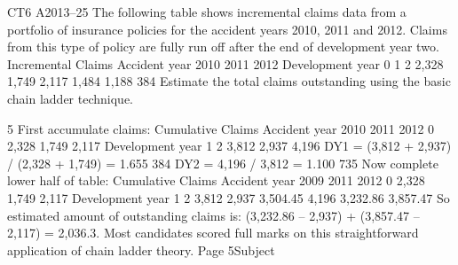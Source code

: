 \documentclass[a4paper,12pt]{article}
\begin{document}
CT6 A2013–25
The following table shows incremental claims data from a portfolio of insurance
policies for the accident years 2010, 2011 and 2012. Claims from this type of policy
are fully run off after the end of development year two.
Incremental
Claims
Accident year
2010
2011
2012
Development year
0
1
2
2,328
1,749
2,117
1,484
1,188
384
Estimate the total claims outstanding using the basic chain ladder technique.

\newpage
5
First accumulate claims:
Cumulative
Claims
Accident year
2010
2011
2012
0
2,328
1,749
2,117
Development year
1
2
3,812
2,937
4,196
DY1 = (3,812 + 2,937) / (2,328 + 1,749) = 1.655 384
DY2 = 4,196 / 3,812 = 1.100 735
Now complete lower half of table:
Cumulative
Claims
Accident year
2009
2011
2012
0
2,328
1,749
2,117
Development year
1
2
3,812
2,937
3,504.45
4,196
3,232.86
3,857.47
So estimated amount of outstanding claims is:
(3,232.86 – 2,937) + (3,857.47 – 2,117) = 2,036.3.
Most candidates scored full marks on this straightforward application of chain ladder theory.
Page 5Subject %
\end{document}
